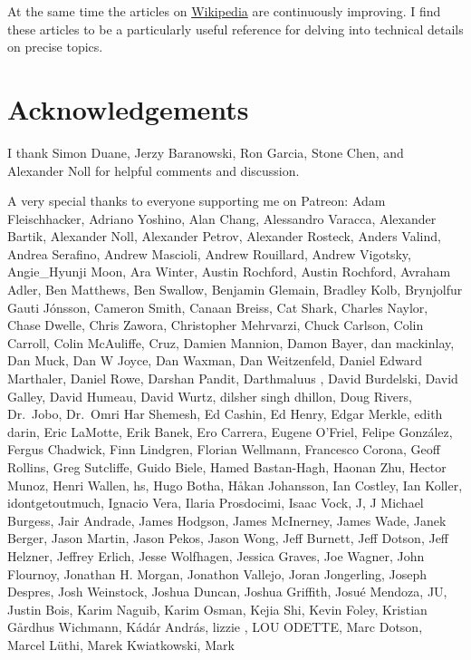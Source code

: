 \documentclass[
  letterpaper,
  DIV=11,
  numbers=noendperiod]{scrartcl}
\begin{document}
At the same time the articles on
\href{https://en.wikipedia.org/wiki/Mathematics}{Wikipedia} are
continuously improving. I find these articles to be a particularly
useful reference for delving into technical details on precise topics.

\hypertarget{acknowledgements}{%
\section*{Acknowledgements}\label{acknowledgements}}

I thank Simon Duane, Jerzy Baranowski, Ron Garcia, Stone Chen, and
Alexander Noll for helpful comments and discussion.

A very special thanks to everyone supporting me on Patreon: Adam
Fleischhacker, Adriano Yoshino, Alan Chang, Alessandro Varacca,
Alexander Bartik, Alexander Noll, Alexander Petrov, Alexander Rosteck,
Anders Valind, Andrea Serafino, Andrew Mascioli, Andrew Rouillard,
Andrew Vigotsky, Angie\_Hyunji Moon, Ara Winter, Austin Rochford, Austin
Rochford, Avraham Adler, Ben Matthews, Ben Swallow, Benjamin Glemain,
Bradley Kolb, Brynjolfur Gauti Jónsson, Cameron Smith, Canaan Breiss,
Cat Shark, Charles Naylor, Chase Dwelle, Chris Zawora, Christopher
Mehrvarzi, Chuck Carlson, Colin Carroll, Colin McAuliffe, Cruz, Damien
Mannion, Damon Bayer, dan mackinlay, Dan Muck, Dan W Joyce, Dan Waxman,
Dan Weitzenfeld, Daniel Edward Marthaler, Daniel Rowe, Darshan Pandit,
Darthmaluus , David Burdelski, David Galley, David Humeau, David Wurtz,
dilsher singh dhillon, Doug Rivers, Dr.~Jobo, Dr.~Omri Har Shemesh, Ed
Cashin, Ed Henry, Edgar Merkle, edith darin, Eric LaMotte, Erik Banek,
Ero Carrera, Eugene O'Friel, Felipe González, Fergus Chadwick, Finn
Lindgren, Florian Wellmann, Francesco Corona, Geoff Rollins, Greg
Sutcliffe, Guido Biele, Hamed Bastan-Hagh, Haonan Zhu, Hector Munoz,
Henri Wallen, hs, Hugo Botha, Håkan Johansson, Ian Costley, Ian Koller,
idontgetoutmuch, Ignacio Vera, Ilaria Prosdocimi, Isaac Vock, J, J
Michael Burgess, Jair Andrade, James Hodgson, James McInerney, James
Wade, Janek Berger, Jason Martin, Jason Pekos, Jason Wong, Jeff Burnett,
Jeff Dotson, Jeff Helzner, Jeffrey Erlich, Jesse Wolfhagen, Jessica
Graves, Joe Wagner, John Flournoy, Jonathan H. Morgan, Jonathon Vallejo,
Joran Jongerling, Joseph Despres, Josh Weinstock, Joshua Duncan, Joshua
Griffith, Josué Mendoza, JU, Justin Bois, Karim Naguib, Karim Osman,
Kejia Shi, Kevin Foley, Kristian Gårdhus Wichmann, Kádár András, lizzie
, LOU ODETTE, Marc Dotson, Marcel Lüthi, Marek Kwiatkowski, Mark
\end{document}
